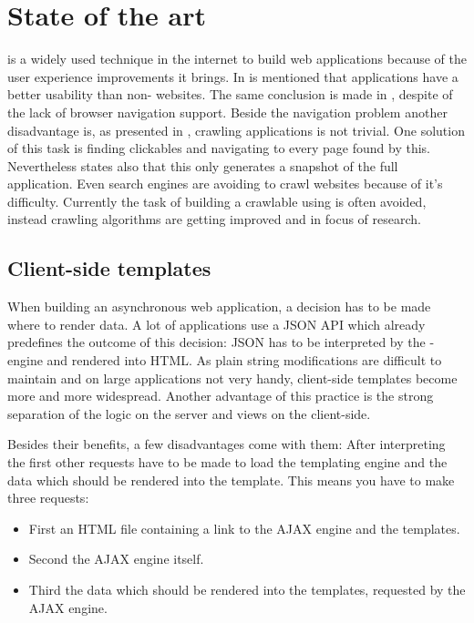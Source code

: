 \section{State of the art}
\ajax{} is a widely used technique in the internet to build web applications because of the user experience improvements it brings.
In \cite{bib:roodt06} is mentioned that \ajax{} applications have a better usability than non-\ajax{} websites.
The same conclusion is made in \cite{bib:klugeKarglWeber07}, despite of the lack of browser navigation support.
Beside the navigation problem another disadvantage is, as presented in \cite{bib:mesbah09}, crawling \ajax{} applications is not trivial.
One solution of this task is finding clickables and navigating to every page found by this.
Nevertheless \cite{bib:mesbah09} states also that this only generates a snapshot of the full application.
Even search engines are avoiding to crawl websites because of it's difficulty\cite{bib:matter08}.
Currently the task of building a crawlable \singlePageApplication{} using \ajax{} is often avoided, instead crawling algorithms are getting improved and in focus of research.

\subsection{Client-side templates\label{clientSideTemplates}}
When building an asynchronous web application, a decision has to be made where to render data.
A lot of \ajax{} applications use a JSON API which already predefines the outcome of this decision:
JSON has to be interpreted by the \ajax{}-engine and rendered into HTML.
As plain string modifications are difficult to maintain and on large applications not very handy, client-side templates become more and more widespread.
Another advantage of this practice is the strong separation of the logic on the server and views on the client-side.

Besides their benefits, a few disadvantages come with them:
After interpreting the first \httpRequest{} other requests have to be made to load the templating engine and the data which should be rendered into the template.
This means you have to make three requests:
\begin{itemize}
    \item First an HTML file containing a link to the AJAX engine and the templates.
    \item Second the AJAX engine itself.
    \item Third the data which should be rendered into the templates, requested by the AJAX engine.
\end{itemize}

